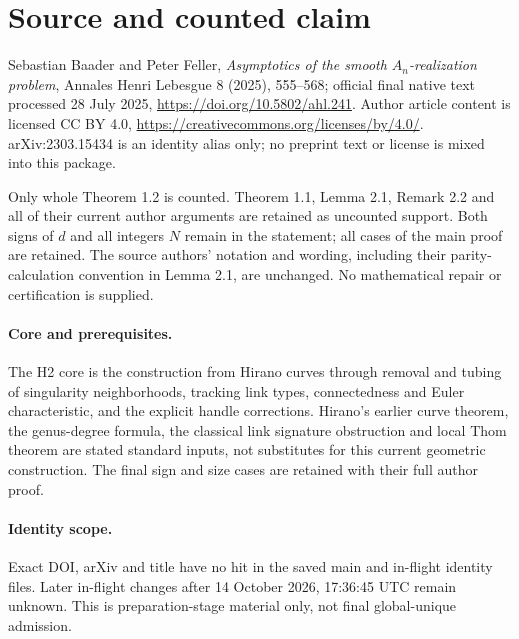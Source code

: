 \section*{Source and counted claim}
Sebastian Baader and Peter Feller, \emph{Asymptotics of the smooth $A_n$-realization problem}, Annales Henri Lebesgue 8 (2025), 555--568; official final native text processed 28 July 2025, \url{https://doi.org/10.5802/ahl.241}. Author article content is licensed CC BY 4.0, \url{https://creativecommons.org/licenses/by/4.0/}. arXiv:2303.15434 is an identity alias only; no preprint text or license is mixed into this package.

Only whole Theorem 1.2 is counted. Theorem 1.1, Lemma 2.1, Remark 2.2 and all of their current author arguments are retained as uncounted support. Both signs of $d$ and all integers $N$ remain in the statement; all cases of the main proof are retained. The source authors' notation and wording, including their parity-calculation convention in Lemma 2.1, are unchanged. No mathematical repair or certification is supplied.

\paragraph{Core and prerequisites.} The H2 core is the construction from Hirano curves through removal and tubing of singularity neighborhoods, tracking link types, connectedness and Euler characteristic, and the explicit handle corrections. Hirano's earlier curve theorem, the genus-degree formula, the classical link signature obstruction and local Thom theorem are stated standard inputs, not substitutes for this current geometric construction. The final sign and size cases are retained with their full author proof.

\paragraph{Identity scope.} Exact DOI, arXiv and title have no hit in the saved main and in-flight identity files. Later in-flight changes after 14 October 2026, 17:36:45 UTC remain unknown. This is preparation-stage material only, not final global-unique admission.
